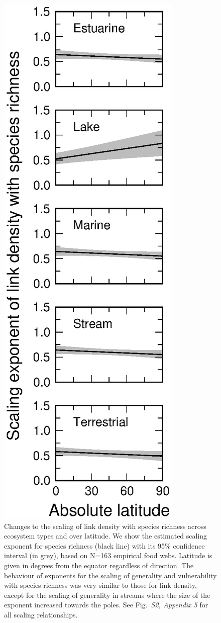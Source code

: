 \documentclass[12pt]{article}
\begin{document}
\begin{figure}[h]
\centerline{\includegraphics*[height=.65\textheight]{Figures/by_TL/marginal/justS_marginal_latitude.eps}}
\caption{Changes to the scaling of link density with species richness across ecosystem
types and over latitude. We show the estimated scaling exponent for species richness (black
line) with its 95\% confidence interval (in grey), based on N=163 empirical food webs.
Latitude is given in degrees from the equator regardless of direction. The
behaviour of exponents for the scaling of generality and vulnerability with
species richness was very  similar to those for link density, except for the
scaling of generality in streams where  the size of the exponent increased
towards the poles. See Fig.~\emph{S2, Appendix 5} for  all scaling
relationships.} \label{S} \end{figure}
\end{document}
